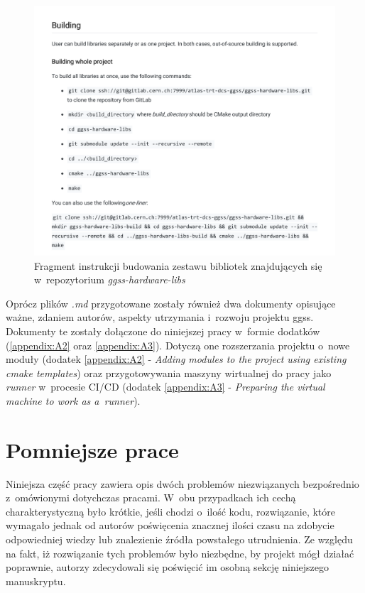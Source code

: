 \begin{figure}
\centering
\includegraphics[width=\textwidth]{res/HardwareLibs}
\caption{Fragment instrukcji budowania zestawu bibliotek znajdujących się w~repozytorium \textit{ggss-hardware-libs}}
\label{fig:markdownHardware}
\end{figure}

Oprócz plików \textit{.md} przygotowane zostały również dwa dokumenty opisujące ważne, zdaniem autorów, aspekty utrzymania i~rozwoju projektu \gls*{ggss}. Dokumenty te zostały dołączone do niniejszej pracy w~formie dodatków (\ref{appendix:A2} oraz \ref{appendix:A3}). Dotyczą one rozszerzania projektu o~nowe moduły (dodatek \ref{appendix:A2} - \textit{Adding modules to the project using existing \gls*{cmake}
templates}) oraz przygotowywania maszyny wirtualnej do pracy jako \textit{runner} w~procesie CI/CD (dodatek \ref{appendix:A3} - \textit{Preparing the virtual machine to work as a~runner}). 

\newpage
\section{Pomniejsze prace}
Niniejsza część pracy zawiera opis dwóch problemów niezwiązanych bezpośrednio z~omówionymi dotychczas pracami. W~obu przypadkach ich cechą charakterystyczną było krótkie, jeśli chodzi o~ilość kodu, rozwiązanie, które wymagało jednak od autorów poświęcenia znacznej ilości czasu na zdobycie odpowiedniej wiedzy lub znalezienie źródła powstałego utrudnienia. Ze względu na fakt, iż rozwiązanie tych problemów było niezbędne, by projekt mógł działać poprawnie, autorzy zdecydowali się poświęcić im osobną sekcję niniejszego manuskryptu.

